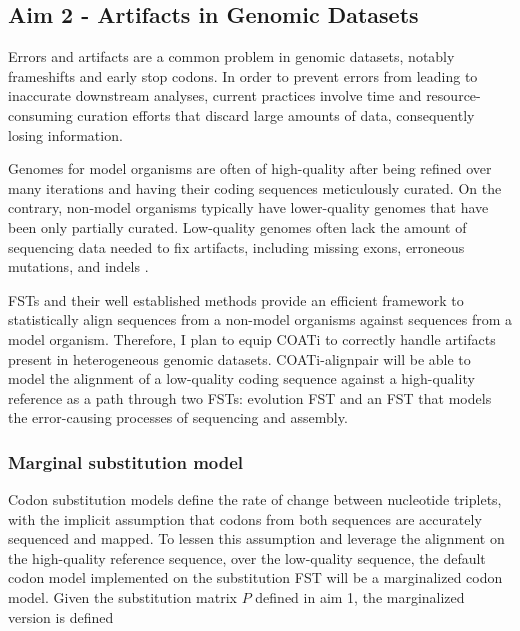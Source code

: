 \subsection{Aim 2 - Artifacts in Genomic Datasets}

Errors and artifacts are a common problem in genomic datasets, notably
frameshifts and early stop codons.
In order to prevent errors from leading to inaccurate downstream analyses,
current practices involve time and resource-consuming curation efforts that
discard large amounts of data, consequently losing information.

Genomes for model organisms are often of high-quality after being refined over
many iterations and having their coding sequences meticulously curated.
On the contrary, non-model organisms typically have lower-quality genomes that
have been only partially curated.
Low-quality genomes often lack the amount of sequencing data needed to fix
artifacts, including missing exons, erroneous mutations, and indels
\parencite{jackman2018tigmint}.

FSTs and their well established methods provide an efficient framework to
statistically align sequences from a non-model organisms against sequences from
a model organism.
Therefore, I plan to equip COATi to correctly handle artifacts present in
heterogeneous genomic datasets.
COATi-alignpair will be able to model the alignment of a low-quality coding
sequence against a high-quality reference as a path through two FSTs: evolution
FST and an FST that models the error-causing processes of sequencing and
assembly.

\subsubsection{Marginal substitution model}


Codon substitution models define the rate of change between nucleotide triplets,
with the implicit assumption that codons from both sequences are accurately
sequenced and mapped.
To lessen this assumption and leverage the alignment on the high-quality
reference sequence, over the low-quality sequence, the default codon model
implemented on the substitution FST will be a marginalized codon model.
Given the substitution matrix $P$ defined in aim 1, the marginalized version is
defined

